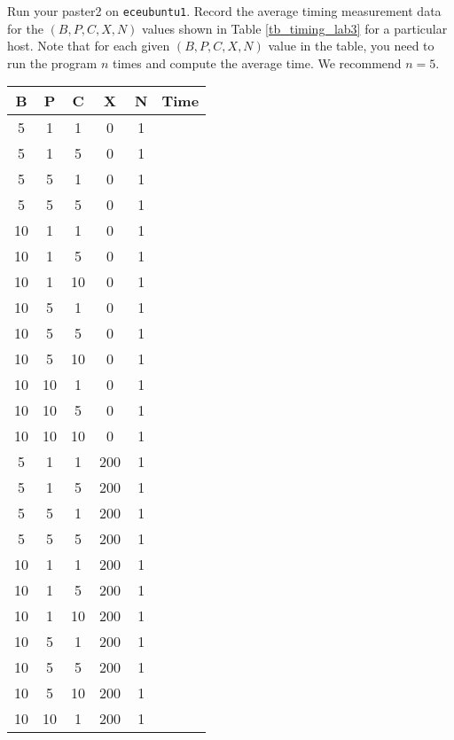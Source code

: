 \begin{enumerate}
  Run your paster2 on \verb+eceubuntu1+. Record the average timing measurement data for the $(B, P, C, X, N)$ values shown in Table \ref{tb_timing_lab3} for a particular host. Note that for each given $(B, P, C, X, N)$ value in the table, you need to run the program $n$ times and compute the average time. We recommend $n=5$.
          \begin{table}[h]
          \begin{center}
          \begin{tabular}{|c|c|c|c|c|c|}
          \hline
 B   & P   & C   & X   & N   &Time   \\ \hline 
5   & 1   & 1   & 0   & 1   &   \\ \hline
5   & 1   & 5   & 0   & 1   &   \\ \hline
5   & 5   & 1   & 0   & 1   &   \\ \hline
5   & 5   & 5   & 0   & 1   &   \\ \hline
10   & 1   & 1   & 0   & 1   &   \\ \hline
10   & 1   & 5   & 0   & 1   &   \\ \hline
10   & 1   & 10   & 0   & 1   &   \\ \hline
10   & 5   & 1   & 0   & 1   &   \\ \hline
10   & 5   & 5   & 0   & 1   &   \\ \hline
10   & 5   & 10   & 0   & 1   &   \\ \hline
10   & 10   & 1   & 0   & 1   &   \\ \hline
10   & 10   & 5   & 0   & 1   &   \\ \hline
10   & 10   & 10   & 0   & 1   &   \\ \hline
5   & 1   & 1   & 200   & 1   &   \\ \hline
5   & 1   & 5   & 200   & 1   &   \\ \hline
5   & 5   & 1   & 200   & 1   &   \\ \hline
5   & 5   & 5   & 200   & 1   &   \\ \hline
10   & 1   & 1   & 200   & 1   &   \\ \hline
10   & 1   & 5   & 200   & 1   &   \\ \hline
10   & 1   & 10   & 200   & 1   &   \\ \hline
10   & 5   & 1   & 200   & 1   &   \\ \hline
10   & 5   & 5   & 200   & 1   &   \\ \hline
10   & 5   & 10   & 200   & 1   &   \\ \hline
10   & 10   & 1   & 200   & 1   &   \\ \hline

\end{tabular}
\end{center}
\end{table}
\end{enumerate}
